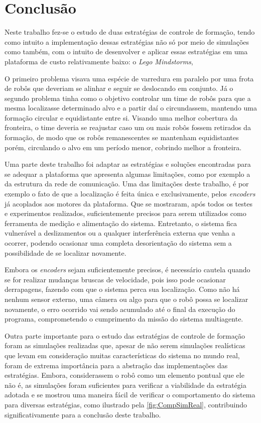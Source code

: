 \chapter{Conclusão}
\label{chap:conclusao}

Neste trabalho fez-se o estudo de duas estratégias de controle de formação, tendo como intuito a implementação dessas estratégias não só por meio de simulações como também, com o intuito de desenvolver e aplicar essas estratégias em uma plataforma de custo relativamente baixo: o \emph{Lego Mindstorms\textregistered},  

O primeiro problema visava uma espécie de varredura em paralelo por uma frota de robôs que deveriam se alinhar e seguir se deslocando em conjunto. Já o segundo problema tinha como o objetivo controlar um time de robôs para que a mesma localizasse determinado alvo e a partir daí o circundassem, mantendo uma formação circular e equidistante entre si. Visando uma melhor cobertura da fronteira, o time deveria se reajustar caso um ou mais robôs fossem retirados da formação, de modo que os robôs remanescentes se mantenham equidistantes porém, circulando o alvo em um período menor, cobrindo melhor a fronteira.

Uma parte deste trabalho foi adaptar as estratégias e soluções encontradas para se adequar a plataforma que apresenta algumas limitações, como por exemplo a da estrutura da rede de comunicação. Uma das limitações deste trabalho, é por exemplo o fato de que a localização é feita única e exclusivamente, pelos \emph{encoders} já acoplados aos motores da plataforma. Que se mostraram, após todos os testes e experimentos realizados, suficientemente precisos para serem utilizados como ferramenta de medição e alimentação do sistema. Entretanto, o sistema fica vulnerável a deslizamentos ou a qualquer interferência externa que venha a ocorrer, podendo ocasionar uma completa desorientação do sistema sem a possibilidade de se localizar novamente. 

Embora os \emph{encoders} sejam suficientemente precisos, é necessário cautela quando se for realizar mudanças bruscas de velocidade, pois isso pode ocasionar derrapagens, fazendo com que o sistema perca sua localização. Como não há nenhum %
sensor externo, uma câmera ou algo para que o robô possa se localizar novamente, o erro ocorrido vai sendo acumulado até o final da execução do programa, comprometendo o cumprimento da missão do sistema multiagente.%

Outra parte importante para o estudo das estratégias de controle de formação foram as simulações realizadas que, apesar de não serem simulações realísticas que levam em consideração muitas características do sistema no mundo real, foram de extrema importância para a abstração das implementações das estratégias. Embora, considerassem o robô como um elemento pontual que ele não é, as simulações foram suficientes para verificar a viabilidade da estratégia adotada e se mostrou uma maneira fácil de verificar o comportamento do sistema para diversas estratégias, como ilustrado pela \autoref{fig:CompSimReal}, contribuindo significativamente para a conclusão deste trabalho.

